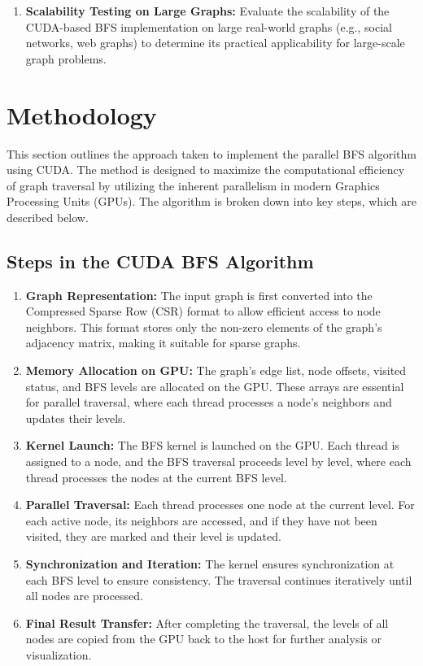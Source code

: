 \documentclass[a4paper,12pt]{article}
\begin{document}
\begin{center}
\begin{enumerate}
    \item \textbf{Scalability Testing on Large Graphs:} Evaluate the scalability of the CUDA-based BFS implementation on large real-world graphs (e.g., social networks, web graphs) to determine its practical applicability for large-scale graph problems.
\end{enumerate}
\newpage
\section*{Methodology}

This section outlines the approach taken to implement the parallel BFS algorithm using CUDA. The method is designed to maximize the computational efficiency of graph traversal by utilizing the inherent parallelism in modern Graphics Processing Units (GPUs). The algorithm is broken down into key steps, which are described below.

\subsection*{Steps in the CUDA BFS Algorithm}

\begin{enumerate}
    \item \textbf{Graph Representation:} The input graph is first converted into the Compressed Sparse Row (CSR) format to allow efficient access to node neighbors. This format stores only the non-zero elements of the graph's adjacency matrix, making it suitable for sparse graphs.
    \item \textbf{Memory Allocation on GPU:} The graph's edge list, node offsets, visited status, and BFS levels are allocated on the GPU. These arrays are essential for parallel traversal, where each thread processes a node's neighbors and updates their levels.
    \item \textbf{Kernel Launch:} The BFS kernel is launched on the GPU. Each thread is assigned to a node, and the BFS traversal proceeds level by level, where each thread processes the nodes at the current BFS level.
    \item \textbf{Parallel Traversal:} Each thread processes one node at the current level. For each active node, its neighbors are accessed, and if they have not been visited, they are marked and their level is updated.
    \item \textbf{Synchronization and Iteration:} The kernel ensures synchronization at each BFS level to ensure consistency. The traversal continues iteratively until all nodes are processed.
    \item \textbf{Final Result Transfer:} After completing the traversal, the levels of all nodes are copied from the GPU back to the host for further analysis or visualization.
\end{enumerate}
\newpage

\end{center}
\end{document}
